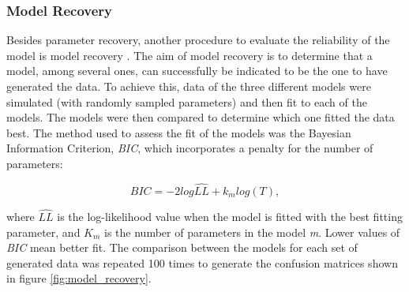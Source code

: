 \documentclass[a4paper,12pt]{article}
\begin{document}
\subsubsection{Model Recovery}
Besides parameter recovery, another procedure to evaluate the reliability of the model is model recovery \citep{Wilson2019a}. The aim of model recovery is to determine that a model, among several ones, can successfully be indicated to be the one to have generated the data. To achieve this, data of the three different models were simulated (with randomly sampled parameters) and then fit to each of the models. The models were then compared to determine which one fitted the data best. The method used to assess the fit of the models was the Bayesian Information Criterion, \textit{BIC}, which incorporates a penalty for the number of parameters:

\begin{equation}
BIC = {-2}log \hat{LL} + k_m log{(T)},
\label{eq:BIC}
\end{equation}

\noindent
where $\hat{LL}$ is the log-likelihood value when the model is fitted with the best fitting parameter, and $K_m$ is the number of parameters in the model \textit{m}. Lower values of \textit{BIC} mean better fit. The comparison between the models for each set of generated data was repeated 100 times to generate the confusion matrices shown in figure \ref{fig:model_recovery}.



\end{document}
